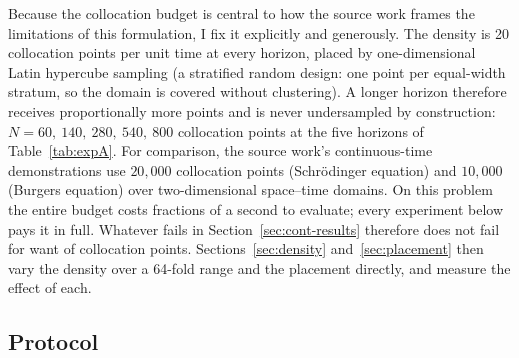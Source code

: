 \documentclass[11pt,a4paper]{article}
\begin{document}
Because the collocation budget is central to how the source work frames the
limitations of this formulation, I fix it explicitly and generously. The
density is 20 collocation points per unit time at every horizon, placed by
one-dimensional Latin hypercube sampling (a stratified random design: one
point per equal-width stratum, so the domain is covered without
clustering). A longer horizon therefore receives proportionally more
points and is never undersampled by construction:
$N = 60,\ 140,\ 280,\ 540,\ 800$ collocation points at the five horizons of
Table~\ref{tab:expA}. For comparison, the source work's continuous-time
demonstrations use $20{,}000$ collocation points (Schr\"odinger equation)
and $10{,}000$ (Burgers equation) over two-dimensional space--time domains.
On this problem the entire budget costs fractions of a second to evaluate;
every experiment below pays it in full. Whatever fails in
Section~\ref{sec:cont-results} therefore does not fail for want of
collocation points. Sections~\ref{sec:density} and~\ref{sec:placement}
then vary the density over a 64-fold range and the placement directly,
and measure the effect of each.

\subsection{Protocol}
\label{sec:cont-protocol}
\end{document}
